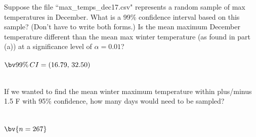 \documentclass{article}
\begin{document}
\begin{flushleft}
\begin{enumalpha}
\item Suppose the file ``max\_temps\_dec17.csv" represents a random sample of max temperatures in December. What is a 99\% confidence interval based on this sample? (Don't have to write both forms.) Is the mean maximum December temperature different than the mean max winter temperature (as found in part (a)) at a significance level of $\alpha = 0.01$?\\
\medskip
{}\\
\medskip
$\bv{99\% \, CI = (16.79,\, 32.50)}$\\
\medskip
{}\\
\vspace{.5in}

\item If we wanted to find the mean winter maximum temperature within plus/minus 1.5 \textdegree F with 95\% confidence, how many days would need to be sampled?\\
\medskip
{}\\
\\
\medskip
$\bv{n=267}$\\

\end{enumalpha}



\end{flushleft}
\end{document}
